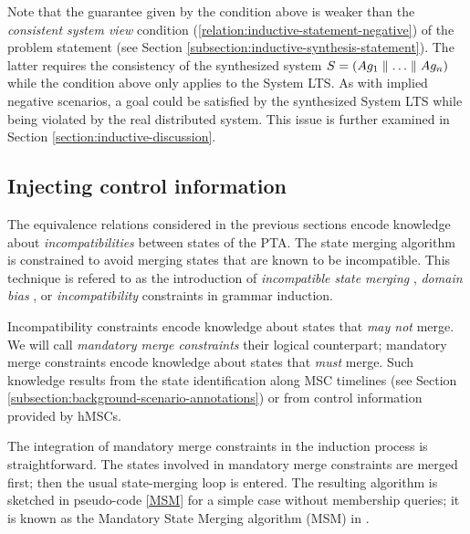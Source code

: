 Note that the guarantee given by the condition above is weaker than the \emph{consistent system view} condition (\ref{relation:inductive-statement-negative}) of the problem statement (see Section \ref{subsection:inductive-synthesis-statement}). The latter requires the consistency of the synthesized system $S = (Ag_1 \parallel \ldots \parallel Ag_n)$ while the condition above only applies to the System LTS. As with implied negative scenarios, a goal could be satisfied by the synthesized System LTS while being violated by the real distributed system. This issue is further examined in Section \ref{section:inductive-discussion}.


\subsection{Injecting control information\label{subsection:induction-pruning-with-control-information}}

The equivalence relations considered in the previous sections encode knowledge about \emph{incompatibilities} between states of the PTA. The state merging algorithm is constrained to avoid merging states that are known to be incompatible. This technique is refered to as the introduction of \emph{incompatible state merging} \cite{Coste:1998}, \emph{domain bias} \cite{Coste:2004}, or \emph{incompatibility} constraints \cite{Lambeau:2008} in grammar induction.

Incompatibility constraints encode knowledge about states that \emph{may not} merge. We will call \emph{mandatory merge constraints} their logical counterpart; mandatory merge constraints encode knowledge about states that \emph{must} merge. Such knowledge results from the state identification along MSC timelines (see Section \ref{subsection:background-scenario-annotations}) or from control information provided by hMSCs.

The integration of mandatory merge constraints in the induction process is straightforward. The states involved in mandatory merge constraints are merged first; then the usual state-merging loop is entered. The resulting algorithm is sketched in pseudo-code \ref{MSM} for a simple case without membership queries; it is known as the Mandatory State Merging algorithm (MSM) in \cite{Lambeau:2008}.

